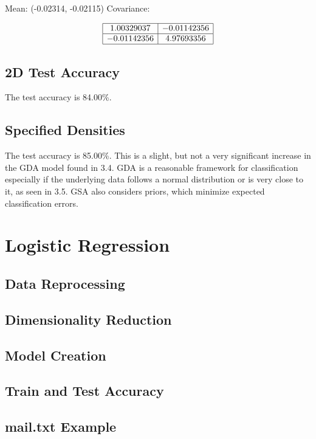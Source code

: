 \documentclass{article}
\begin{document}
Mean: (-0.02314, -0.02115) 
Covariance:

\[
\begin{array}{|c|c|}
\hline
 1.00329037 & -0.01142356 \\
\hline
 -0.01142356 & 4.97693356 \\
\hline
\end{array}
\]

\subsection{2D Test Accuracy}
The test accuracy is 84.00\%.

\subsection{Specified Densities}
The test accuracy is 85.00\%. This is a slight, but not a very significant increase in the GDA model found in 3.4. GDA is a reasonable framework for classification especially if the underlying data follows a normal distribution or is very close to it, as seen in 3.5. GSA also considers priors, which minimize expected classification errors.

\section{Logistic Regression}
\subsection{Data Reprocessing}
\subsection{Dimensionality Reduction}
\subsection{Model Creation}
\subsection{Train and Test Accuracy}
\subsection{mail.txt Example}
\end{document}
